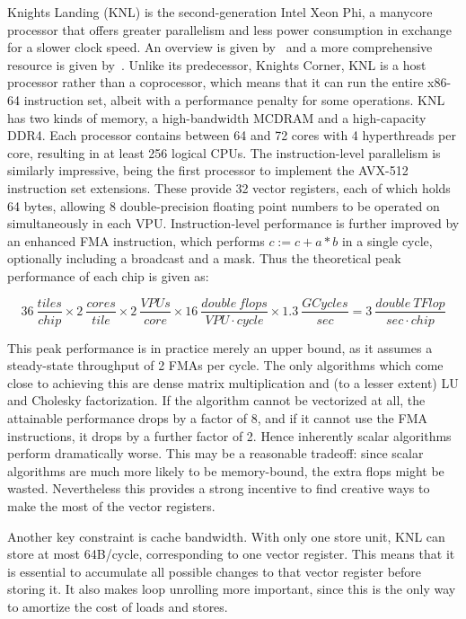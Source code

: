 Knights Landing (KNL) is the second-generation Intel Xeon Phi, a manycore processor that offers greater parallelism and less power consumption in exchange for a slower clock speed. An overview is given by~\cite{Sodani:2016:KLS:2927511.2927563} and a more comprehensive resource is given by~\cite{Jeffers:2016:IXP:3050856}. Unlike its predecessor, Knights Corner, KNL is a host processor rather than a coprocessor, which means that it can run the entire x86-64 instruction set, albeit with a performance penalty for some operations. KNL has two kinds of memory, a high-bandwidth MCDRAM and a high-capacity DDR4. Each processor contains between 64 and 72 cores with 4 hyperthreads per core, resulting in at least 256 logical CPUs. The instruction-level parallelism is similarly impressive, being the first processor to implement the AVX-512 instruction set extensions. These provide 32 vector registers, each of which holds 64 bytes, allowing 8 double-precision floating point numbers to be operated on simultaneously in each \gls{VPU}. Instruction-level performance is further improved by an enhanced \gls{FMA} instruction, which performs $c := c + a*b$ in a single cycle, optionally including a broadcast and a mask. Thus the theoretical peak performance of each chip is given as:

\[
36~\frac{tiles}{chip} \times 2~\frac{cores}{tile} \times 2~\frac{VPUs}{core} \times 16~\frac{double~flops}{VPU \cdot cycle} \times 1.3~\frac{GCycles}{sec} = 3~\frac{double~TFlop}{sec\cdot chip}
  \label{eq:knl_peak_perf}
\]

This peak performance is in practice merely an upper bound, as it assumes a steady-state throughput of 2 FMAs per cycle. The only algorithms which come close to achieving this are dense matrix multiplication and (to a lesser extent) LU and Cholesky factorization. If the algorithm cannot be vectorized at all, the attainable performance drops by a factor of 8, and if it cannot use the FMA instructions, it drops by a further factor of 2. Hence inherently scalar algorithms perform dramatically worse. This may be a reasonable tradeoff: since scalar algorithms are much more likely to be memory-bound, the extra flops might be wasted. Nevertheless this provides a strong incentive to find creative ways to make the most of the vector registers. 

Another key constraint is cache bandwidth. With only one store unit, KNL can store at most 64B/cycle, corresponding to one vector register. This means that it is essential to accumulate all possible changes to that vector register before storing it. It also makes loop unrolling more important, since this is the only way to amortize the cost of loads and stores.

